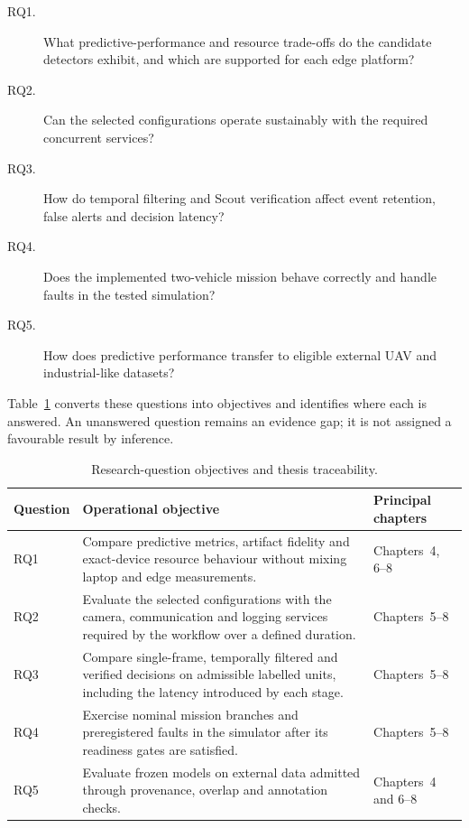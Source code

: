 \begin{description}
  \item[RQ1.] What predictive-performance and resource trade-offs do the
  candidate detectors exhibit, and which are supported for each edge platform?

  \item[RQ2.] Can the selected configurations operate sustainably with the
  required concurrent services?

  \item[RQ3.] How do temporal filtering and Scout verification affect event
  retention, false alerts and decision latency?

  \item[RQ4.] Does the implemented two-vehicle mission behave correctly and
  handle faults in the tested simulation?

  \item[RQ5.] How does predictive performance transfer to eligible external
  UAV and industrial-like datasets?
\end{description}

Table~\ref{tab:rq-objectives} converts these questions into objectives and
identifies where each is answered. An unanswered question remains an evidence
gap; it is not assigned a favourable result by inference.

\begin{table}[H]
  \centering
  \caption{Research-question objectives and thesis traceability.}
  \label{tab:rq-objectives}
  \small
  \begin{tabularx}{\textwidth}{@{}p{}X p{}@{}}
    \toprule
    Question & Operational objective & Principal chapters \\
    \midrule
    RQ1 & Compare predictive metrics, artifact fidelity and exact-device
    resource behaviour without mixing laptop and edge measurements. &
    Chapters~4, 6--8 \\
    RQ2 & Evaluate the selected configurations with the camera, communication
    and logging services required by the workflow over a defined duration. &
    Chapters~5--8 \\
    RQ3 & Compare single-frame, temporally filtered and verified decisions on
    admissible labelled units, including the latency introduced by each stage. &
    Chapters~5--8 \\
    RQ4 & Exercise nominal mission branches and preregistered faults in the
    simulator after its readiness gates are satisfied. & Chapters~5--8 \\
    RQ5 & Evaluate frozen models on external data admitted through provenance,
    overlap and annotation checks. & Chapters~4 and 6--8 \\
    \bottomrule
  \end{tabularx}
\end{table}

